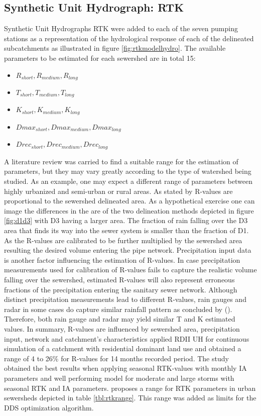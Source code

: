 \subsection{Synthetic Unit Hydrograph: RTK}

Synthetic Unit Hydrographs RTK were added to each of the seven pumping stations as a representation of the hydrological response of each of the delineated subcatchments as illustrated in figure \ref{fig:rtkmodelhydro}. The available parameters to be estimated for each sewershed are in total 15:
\begin{itemize}
    \item $R_{short}, R_{medium}, R_{long}$
    \item $T_{short}, T_{medium}, T_{long}$
    \item $K_{short}, K_{medium}, K_{long}$
    \item $Dmax_{short}, Dmax_{medium}, Dmax_{long}$
    \item $Drec_{short}, Drec_{medium}, Drec_{long}$
\end{itemize}


A literature review was carried to find a suitable range for the estimation of parameters, but they may vary greatly according to the type of watershed being studied. As an example, one may expect a different range of parameters between highly urbanized and semi-urban or rural areas.
As stated by \citet{Vallabhaneni2007} R-values are proportional to the sewershed delineated area. As a hypothetical exercise one can image the differences in the are of the two delineation methods depicted in figure \ref{fig:d1d3} with D3 having a larger area. The fraction of rain falling over the D3 area that finds its way into the sewer system is smaller than the fraction of D1. As the R-values are calibrated to be further multiplied by the sewershed area resulting the desired volume entering the pipe network.
Precipitation input data is another factor influencing the estimation of R-values. In case precipitation measurements used for calibration of R-values fails to capture the realistic volume falling over the sewershed, estimated R-values will also represent erroneous fractions of the precipitation entering the sanitary sewer network. 
Although distinct precipitation measurements lead to different R-values, rain gauges and radar in some cases do capture similar rainfall pattern as concluded by (\citet{wride2004}). Therefore, both rain gauge and radar may yield similar T and K estimated values.
In summary, R-values are influenced by sewershed area, precipitation input, network and catchment’s characteristics 
\citet{Barden2015} applied RDII UH for continuous simulation of a catchment with residential dominant land use and obtained a range of 4 to 26\% for R-values for 14 months recorded period. The study obtained the best results when applying seasonal RTK-values with monthly IA parameters and well performing model for moderate and large storms with seasonal RTK and IA parameters. 
\citet{Vallabhaneni2007} proposes a range for RTK parameters in urban sewersheds depicted in table \ref{tbl:rtkrange}. This range was added as limits for the DDS optimization algorithm.

